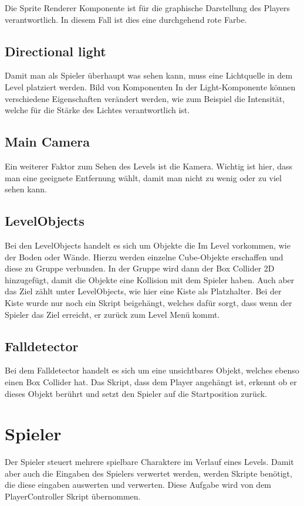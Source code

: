 Die Sprite Renderer Komponente ist für die graphische Darstellung des Players verantwortlich. In diesem Fall ist dies eine durchgehend rote Farbe.

\subsection{Directional light}
Damit man als Spieler überhaupt was sehen kann, muss eine Lichtquelle in dem Level platziert werden. Bild von Komponenten In der Light-Komponente können verschiedene Eigenschaften verändert werden, wie zum Beispiel die Intensität, welche für die Stärke des Lichtes verantwortlich ist.
\subsection{Main Camera}
Ein weiterer Faktor zum Sehen des Levels ist die Kamera. Wichtig ist hier, dass man eine geeignete Entfernung wählt, damit man nicht zu wenig oder zu viel sehen kann.
\subsection{LevelObjects}
Bei den LevelObjects handelt es sich um Objekte die Im Level vorkommen, wie der Boden oder Wände. Hierzu werden einzelne Cube-Objekte erschaffen und diese zu Gruppe verbunden. In der Gruppe wird dann der Box Collider 2D hinzugefügt, damit die Objekte eine Kollision mit dem Spieler haben. Auch aber das Ziel zählt unter LevelObjects, wie hier eine Kiste als Platzhalter. Bei der Kiste wurde nur noch ein Skript beigehängt, welches dafür sorgt, dass wenn der Spieler das Ziel erreicht, er zurück zum Level Menü kommt.
\subsection{Falldetector}
Bei dem Falldetector handelt es sich um eine unsichtbares Objekt, welches ebenso einen Box Collider hat. Das Skript, dass dem Player angehängt ist, erkennt ob er dieses Objekt berührt und setzt den Spieler auf die Startposition zurück.
\newpage
\section{Spieler}
\def \currentAuthor {Michael Leitner}
Der Spieler steuert mehrere spielbare Charaktere im Verlauf eines Levels. Damit aber auch die Eingaben des Spielers verwertet werden, werden Skripte benötigt, die diese eingaben auswerten und verwerten. Diese Aufgabe wird von dem PlayerController Skript übernommen. 
